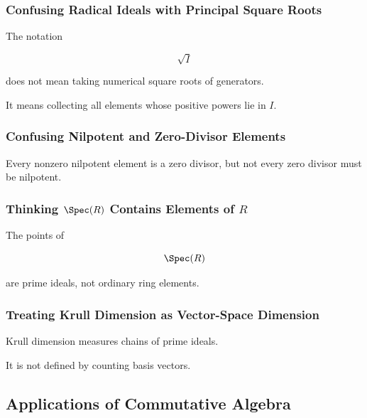 \subsubsection{Confusing Radical Ideals with Principal Square Roots}

The notation

\[ \sqrt{I} \]

does not mean taking numerical square roots of generators.

It means collecting all elements whose positive powers lie in \(I\).

\subsubsection{Confusing Nilpotent and Zero-Divisor Elements}

Every nonzero nilpotent element is a zero divisor, but not every zero divisor
must be nilpotent.

\subsubsection{Thinking \(\Spec(R)\) Contains Elements of \(R\)}

The points of

\[ \Spec(R) \]

are prime ideals, not ordinary ring elements.

\subsubsection{Treating Krull Dimension as Vector-Space Dimension}

Krull dimension measures chains of prime ideals.

It is not defined by counting basis vectors.

\subsection{Applications of Commutative Algebra}
\label{subsec:commutative-algebra-applications}

